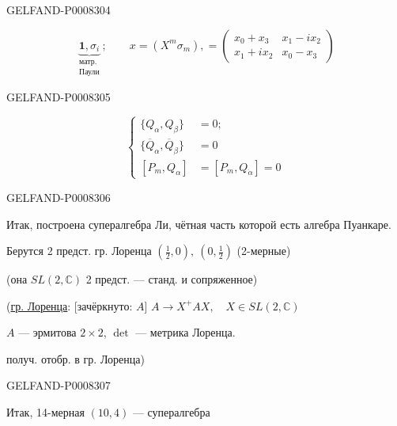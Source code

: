 \begin{GelfandAdjacentEvidence}{GELFAND-P000830}{4}


\[
\underbrace{\mathbf{1},\sigma_i}_{\substack{\text{матр.}\\\text{Паули}}};
\qquad x=(X^m\sigma_m),=
\begin{pmatrix}
x_0+x_3&x_1-i x_2\\
x_1+i x_2&x_0-x_3
\end{pmatrix}
\]
\end{GelfandAdjacentEvidence}
\begin{GelfandAdjacentEvidence}{GELFAND-P000830}{5}


\begin{equation*}
\left\{\begin{aligned}
\{Q_\alpha,Q_\beta\}&=0;\\
\{\overline{Q}_\alpha,\overline{Q}_\beta\}&=0\\
[P_m,Q_\alpha]&=[P_m,Q_{\dot\alpha}]=0
\end{aligned}\right.\tag{1}
\end{equation*}
\end{GelfandAdjacentEvidence}
\begin{GelfandAdjacentEvidence}{GELFAND-P000830}{6}


Итак, построена супералгебра Ли, чётная часть которой есть алгебра Пуанкаре.

Берутся 2 предст. гр. Лоренца \(\left(\frac12,0\right),\ \left(0,\frac12\right)\) (2-мерные)

(она \(SL(2,\mathbb{C})\) 2 предст. — станд. и сопряженное)

(\uline{гр. Лоренца}: [зачёркнуто: \sout{\(A\)}]
\(A\to X^+AX,\quad X\in SL(2,\mathbb{C})\)

\(A\) — эрмитова \(2\times2\), \(\det\) — метрика Лоренца.

получ. отобр. в гр. Лоренца)
\end{GelfandAdjacentEvidence}
\begin{GelfandAdjacentEvidence}{GELFAND-P000830}{7}


Итак, 14-мерная \((10,4)\) — супералгебра
\end{GelfandAdjacentEvidence}
